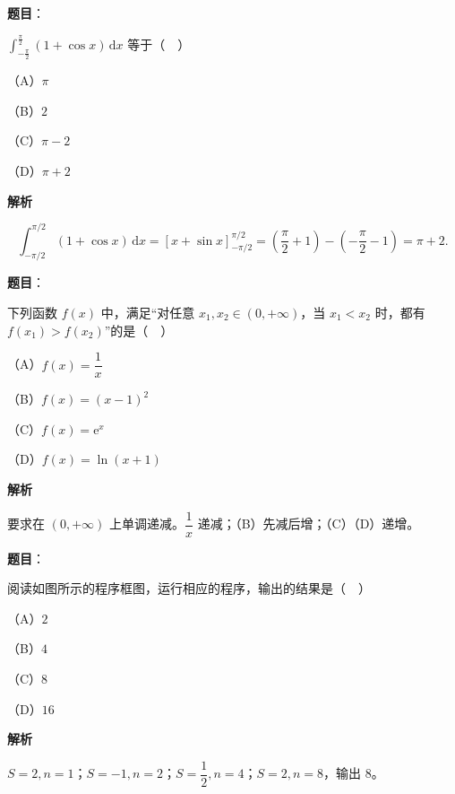 \begin{answer}

\textbf{题目}：

$\displaystyle\int_{-\frac\pi2}^{\frac\pi2}(1+\cos x)\,\mathrm dx$ 等于（　）

（A）$\pi$

（B）$2$

（C）$\pi-2$

（D）$\pi+2$

\textbf{解析}

\nopagebreak[4]
\[\int_{-\pi/2}^{\pi/2}(1+\cos x)\,\mathrm dx
=\left[x+\sin x\right]_{-\pi/2}^{\pi/2}
=\left(\frac\pi2+1\right)-\left(-\frac\pi2-1\right)=\pi+2.\]


\end{answer}
\begin{answer}

\textbf{题目}：

下列函数 $f(x)$ 中，满足“对任意 $x_1,x_2\in(0,+\infty)$，当 $x_1<x_2$ 时，都有 $f(x_1)>f(x_2)$”的是（　）

（A）$f(x)=\dfrac1x$

（B）$f(x)=(x-1)^2$

（C）$f(x)=\mathrm e^x$

（D）$f(x)=\ln(x+1)$

\textbf{解析}

要求在 $(0,+\infty)$ 上单调递减。$\dfrac1x$ 递减；（B）先减后增；（C）（D）递增。


\end{answer}
\begin{answer}

\textbf{题目}：

阅读如图所示的程序框图，运行相应的程序，输出的结果是（　）
\nopagebreak[4]
\begin{center}\end{center}
\nopagebreak[4]
（A）$2$

（B）$4$

（C）$8$

（D）$16$

\textbf{解析}

$S=2,n=1$；$S=-1,n=2$；$S=\dfrac12,n=4$；$S=2,n=8$，输出 $8$。


\end{answer}
